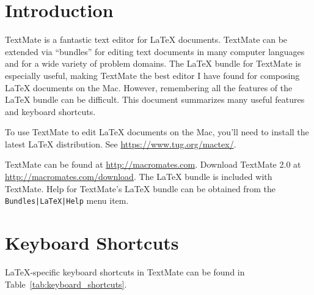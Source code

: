 \documentclass[10pt]{article}
\begin{document}
\maketitle

\begin{abstract}
TextMate is a fantastic editor for \LaTeX{} documents. 
This short paper summarizes many features, including
keyboard shortcuts, 
typsetting, and 
GitHub integration,
available in TextMate's \LaTeX{} bundle.
\end{abstract}

\section{Introduction}
TextMate is a fantastic text editor for \LaTeX{} documents.
TextMate can be extended via ``bundles'' for editing text documents 
in many computer languages and for a wide variety of problem domains.
The \LaTeX{} bundle for TextMate is especially useful, making TextMate
the best editor I have found for
composing \LaTeX{} documents on the Mac.
However, remembering all the features of the \LaTeX{} bundle can be difficult.
This document summarizes many useful features and keyboard shortcuts.

To use TextMate to edit \LaTeX{} documents on the Mac, 
you'll need to install the latest \LaTeX{} distribution.
See \url{https://www.tug.org/mactex/}.

TextMate can be found at \url{http://macromates.com}. 
Download TextMate 2.0 at \url{http://macromates.com/download}. 
The \LaTeX{} bundle is included with TextMate. 
Help for TextMate's \LaTeX{} bundle can be obtained from the
\texttt{Bundles|LaTeX|Help} menu item.


\section{Keyboard Shortcuts} %
\label{sec:keyboard_shortcuts}
\LaTeX{}-specific keyboard shortcuts in TextMate can be found in Table~\ref{tab:keyboard_shortcuts}.
\end{document}
